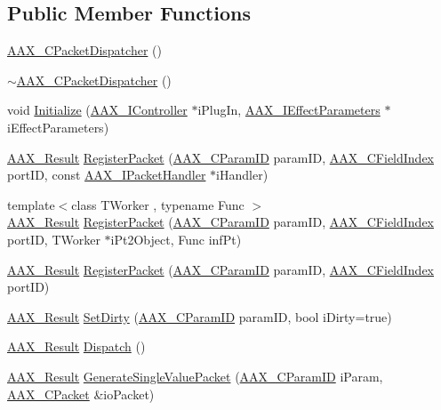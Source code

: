 \subsection*{Public Member Functions}
\begin{DoxyCompactItemize}
\item 
\hyperlink{a00031_a1b9b60206849807c11045fb865a4dd49}{A\+A\+X\+\_\+\+C\+Packet\+Dispatcher} ()
\item 
\hyperlink{a00031_a1eb3ce17e895e30106316c33bc44307f}{$\sim$\+A\+A\+X\+\_\+\+C\+Packet\+Dispatcher} ()
\item 
void \hyperlink{a00031_abc64d59b8b9f652013ccf848987ea797}{Initialize} (\hyperlink{a00090}{A\+A\+X\+\_\+\+I\+Controller} $\ast$i\+Plug\+In, \hyperlink{a00099}{A\+A\+X\+\_\+\+I\+Effect\+Parameters} $\ast$i\+Effect\+Parameters)
\item 
\hyperlink{a00149_a4d8f69a697df7f70c3a8e9b8ee130d2f}{A\+A\+X\+\_\+\+Result} \hyperlink{a00031_a1848f0bfa473b54e9ee8e32872c89cb1}{Register\+Packet} (\hyperlink{a00149_a1440c756fe5cb158b78193b2fc1780d1}{A\+A\+X\+\_\+\+C\+Param\+I\+D} param\+I\+D, \hyperlink{a00149_ae807f8986143820cfb5d6da32165c9c7}{A\+A\+X\+\_\+\+C\+Field\+Index} port\+I\+D, const \hyperlink{a00106}{A\+A\+X\+\_\+\+I\+Packet\+Handler} $\ast$i\+Handler)
\item 
{\footnotesize template$<$class T\+Worker , typename Func $>$ }\\\hyperlink{a00149_a4d8f69a697df7f70c3a8e9b8ee130d2f}{A\+A\+X\+\_\+\+Result} \hyperlink{a00031_af83ca953818597116ef11a345eef2e36}{Register\+Packet} (\hyperlink{a00149_a1440c756fe5cb158b78193b2fc1780d1}{A\+A\+X\+\_\+\+C\+Param\+I\+D} param\+I\+D, \hyperlink{a00149_ae807f8986143820cfb5d6da32165c9c7}{A\+A\+X\+\_\+\+C\+Field\+Index} port\+I\+D, T\+Worker $\ast$i\+Pt2\+Object, Func inf\+Pt)
\item 
\hyperlink{a00149_a4d8f69a697df7f70c3a8e9b8ee130d2f}{A\+A\+X\+\_\+\+Result} \hyperlink{a00031_a767959a133afaa2e44bfafc79d0b5c69}{Register\+Packet} (\hyperlink{a00149_a1440c756fe5cb158b78193b2fc1780d1}{A\+A\+X\+\_\+\+C\+Param\+I\+D} param\+I\+D, \hyperlink{a00149_ae807f8986143820cfb5d6da32165c9c7}{A\+A\+X\+\_\+\+C\+Field\+Index} port\+I\+D)
\item 
\hyperlink{a00149_a4d8f69a697df7f70c3a8e9b8ee130d2f}{A\+A\+X\+\_\+\+Result} \hyperlink{a00031_a6d4254a842eeee46a227ec761619efb5}{Set\+Dirty} (\hyperlink{a00149_a1440c756fe5cb158b78193b2fc1780d1}{A\+A\+X\+\_\+\+C\+Param\+I\+D} param\+I\+D, bool i\+Dirty=true)
\item 
\hyperlink{a00149_a4d8f69a697df7f70c3a8e9b8ee130d2f}{A\+A\+X\+\_\+\+Result} \hyperlink{a00031_aec68e7f8f440e394a3e4ab698a5f06f9}{Dispatch} ()
\item 
\hyperlink{a00149_a4d8f69a697df7f70c3a8e9b8ee130d2f}{A\+A\+X\+\_\+\+Result} \hyperlink{a00031_afa837e03b555f3093144838bddd558f3}{Generate\+Single\+Value\+Packet} (\hyperlink{a00149_a1440c756fe5cb158b78193b2fc1780d1}{A\+A\+X\+\_\+\+C\+Param\+I\+D} i\+Param, \hyperlink{a00030}{A\+A\+X\+\_\+\+C\+Packet} \&io\+Packet)
\end{DoxyCompactItemize}


